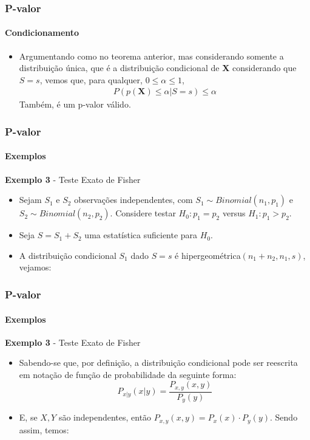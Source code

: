 \begin{frame}[c] 
\frametitle{P-valor} 
\framesubtitle{Condicionamento}
\begin{itemize}
    \justifying
    \item Argumentando como no teorema anterior, mas considerando somente a distribuição única, que é a distribuição condicional de \textbf{X} considerando que $S=s$, vemos que, para qualquer, $0 \leq \alpha \leq 1$, 
\begin{align}
    P(p(\textbf{X}) \leq \alpha| S=s) \leq \alpha
\end{align}
Também, é um p-valor válido.
\end{itemize}
\end{frame}

\begin{frame}[c]
\frametitle{P-valor} 
\framesubtitle{Exemplos}
\begin{exampleblock}{\textbf{Exemplo 3} - Teste Exato de Fisher} %
\begin{itemize}
    \item Sejam $S_{1}$ e $S_{2}$ observações independentes, com $S_{1} \sim Binomial(n_1,p_1)$ e $S_{2} \sim Binomial(n_2,p_2)$. Considere testar $H_0: p_1=p_2$ versus $H_1: p_1 > p_2$.
    \item Seja $S=S_1+S_2$ uma estatística suficiente para $H_0$.
    \item A distribuição condicional $S_1$ dado $S=s$ é hipergeométrica$(n_1+n_2,n_1,s)$, vejamos:
\end{itemize}
\end{exampleblock}
\end{frame}

\begin{frame}[c]
\frametitle{P-valor} 
\framesubtitle{Exemplos}
\begin{exampleblock}{\textbf{Exemplo 3} - Teste Exato de Fisher} %
\begin{itemize}
    \item Sabendo-se que, por definição, a distribuição condicional pode ser reescrita em notação de função de probabilidade da seguinte forma:
    \begin{equation*}
        P_{x|y}(x|y)=\frac{P_{x,y}(x,y)}{P_{y}(y)}
    \end{equation*}
    \item E, se $X,Y$ são independentes, então $P_{x,y}(x,y)=P_{x}(x)\cdot P_{y}(y)$. Sendo assim, temos:
\end{itemize}
\end{exampleblock}
\end{frame}

